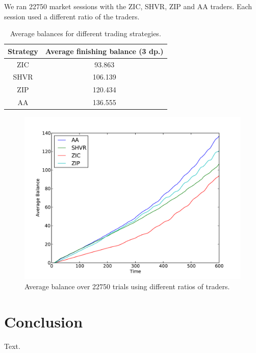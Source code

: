\documentclass[preprint]{acm_proc_article-sp} %
\begin{document}
We ran 22750 market sessions with the ZIC, SHVR, ZIP and AA traders.
Each session used a different ratio of the traders.

\begin{table}[h]
  \centering
  \label{tbl:results}
  \begin{tabular}{ | c | c | }
    \hline
    Strategy & Average finishing balance (3 dp.) \\
    \hline
    ZIC & 93.863 \\
    SHVR & 106.139 \\
    ZIP & 120.434 \\
    AA & 136.555 \\
    \hline
  \end{tabular}
  \caption{Average balances for different trading strategies.}
\end{table}

\begin{figure} 
\centering
\includegraphics[width=\columnwidth]{graphs_and_stats/graph_average_balance_vs_time.pdf}
\caption{Average balance over 22750 trials using different ratios of traders.}
\end{figure}


\section{Conclusion} \label{sec:conclusion}
Text.\\


\pagebreak


\end{document}
